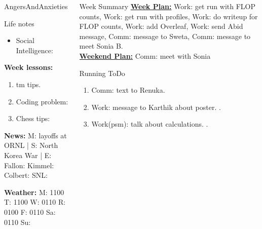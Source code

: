 \begin{columns}
\begin{column}{0.20\linewidth}
\begin{block}{AngersAndAnxieties}
\begin{itemize}
      \end{itemize}
    \end{block}
      \begin{block}{Life notes}
        \begin{itemize}
          \tiny \item \tiny Social Intelligence: 
        \end{itemize}
      \end{block}
      \begin{block}
        {\tiny {\bf Week lessons:}}
        \begin{enumerate}
        \item \tiny tm tips.
        \item \tiny Coding problem: 
        \item \tiny Chess tips: 
        \end{enumerate}
            {{\tiny {\tiny \bf  News:}} {\tiny  M: layoffs at ORNL | S: North Korea War
                | E: Fallon:  Kimmel:  Colbert: SNL:}}

            {{\tiny {\tiny \bf  Weather:}} {\tiny M: 1100 T: 1100 W:
                0110 R: 0100 F: 0110 Sa: 0110 Su: }}
      \end{block}
  \end{column}
  \begin{column}{0.6\linewidth}
    \begin{block}{Week Summary}
      {\underline {\bf Week Plan:} Work: get run with FLOP counts,  
        Work: get run with profiles, Work: do writeup for FLOP counts, Work: add Overleaf, Work: send Abid message, 
        Comm: message to Sweta, Comm: message to meet Sonia B. } \\

      {\underline{\bf Weekend Plan:} Comm: meet with Sonia} \\

    \end{block}
      \begin{block}{Running ToDo} %

        \begin{enumerate}
        \item \tiny Comm: text to Renuka. 

        \item \tiny Work: message to Karthik about poster. . 
      \item \tiny Work(psm): talk about calculations. 
        . 
      

\end{enumerate}
\end{block}
\end{column}
\end{columns}
